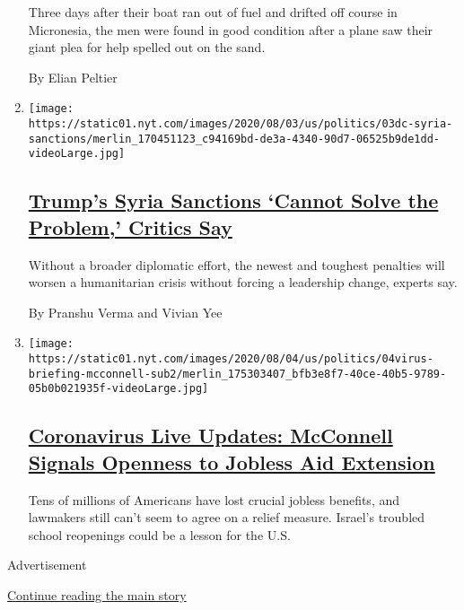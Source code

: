 \begin{enumerate}
  Three days after their boat ran out of fuel and drifted off course in
  Micronesia, the men were found in good condition after a plane saw
  their giant plea for help spelled out on the sand.

  By Elian Peltier
\item
  \texttt{[image: https://static01.nyt.com/images/2020/08/03/us/politics/03dc-syria-sanctions/merlin\_170451123\_c94169bd-de3a-4340-90d7-06525b9de1dd-videoLarge.jpg]}

  \hypertarget{trumps-syria-sanctions-cannot-solve-the-problem-critics-say}{%
  \subsection{\texorpdfstring{\href{/2020/08/04/world/middleeast/trump-assad-syria-sanctions.html}{Trump's
  Syria Sanctions `Cannot Solve the Problem,' Critics
  Say}}{Trump's Syria Sanctions `Cannot Solve the Problem,' Critics Say}}\label{trumps-syria-sanctions-cannot-solve-the-problem-critics-say}}

  Without a broader diplomatic effort, the newest and toughest penalties
  will worsen a humanitarian crisis without forcing a leadership change,
  experts say.

  By Pranshu Verma and Vivian Yee
\item
  \texttt{[image: https://static01.nyt.com/images/2020/08/04/us/politics/04virus-briefing-mcconnell-sub2/merlin\_175303407\_bfb3e8f7-40ce-40b5-9789-05b0b021935f-videoLarge.jpg]}

  \hypertarget{coronavirus-live-updates-mcconnell-signals-openness-to-jobless-aid-extension}{%
  \subsection{\texorpdfstring{\href{/2020/08/04/world/coronavirus-cases.html}{Coronavirus
  Live Updates: McConnell Signals Openness to Jobless Aid
  Extension}}{Coronavirus Live Updates: McConnell Signals Openness to Jobless Aid Extension}}\label{coronavirus-live-updates-mcconnell-signals-openness-to-jobless-aid-extension}}

  Tens of millions of Americans have lost crucial jobless benefits, and
  lawmakers still can't seem to agree on a relief measure. Israel's
  troubled school reopenings could be a lesson for the U.S.
\end{enumerate}

Advertisement

\protect\hyperlink{after-mid1}{Continue reading the main story}

